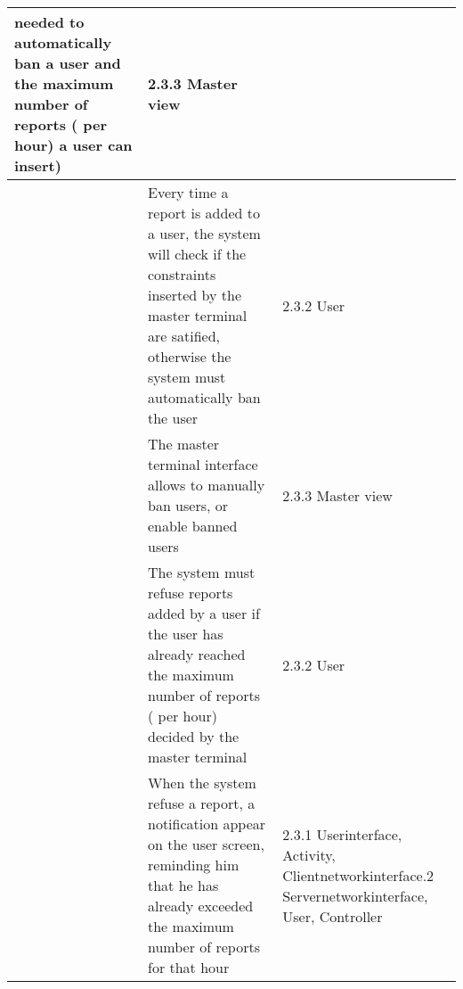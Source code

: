 \begin{center}
\begin{longtable}{| m{2cm} | m{6cm} | m{5cm} | }
	 needed to automatically ban a user and the maximum number of reports ( per hour) a user can insert)& 2.3.3 Master view\\ \hline
      & Every time a report is added to a user, the system will check if the constraints inserted by the master terminal are satified,
	otherwise the system must automatically ban the user&  2.3.2 User\\ \hline
      & The master terminal interface allows to manually ban users, or enable banned users& 2.3.3 Master view\\ \hline
      & The system must refuse reports added by a user if the user has already reached the maximum number of reports ( per hour) decided
	 by the master terminal& 2.3.2 User \\ \hline
      & When the system refuse a report, a notification appear on the user screen, reminding him that he has already exceeded
	the maximum number of reports for that hour& 2.3.1 Userinterface, Activity, Clientnetworkinterface\newline
						     2.3.2 Servernetworkinterface, User, Controller\\ \hline
 \end{longtable}
\end{center}

